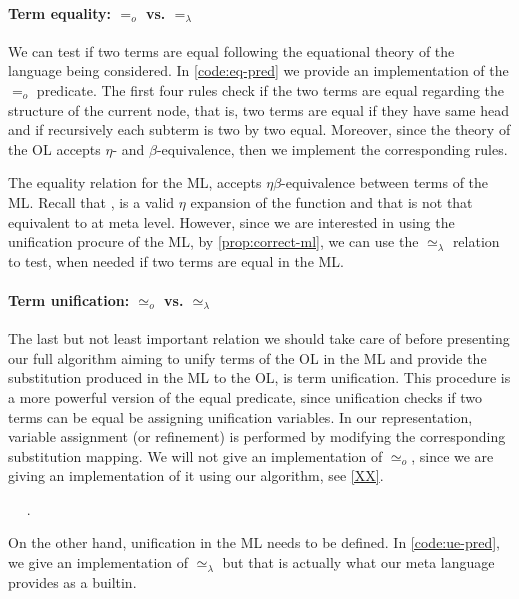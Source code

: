 \documentclass[sigconf,natbib=false]{acmart}
\newcommand{\EqualRel}{\ensuremath{=}}
\newcommand{\UnifRel}{\ensuremath{\simeq}}
\newcommand{\Uo}{\ensuremath{\UnifRel_o}\xspace}
\newcommand{\Eo}{\ensuremath{\EqualRel_o}\xspace}
\newcommand{\Ue}{\ensuremath{\UnifRel_\lambda}\xspace}
\newcommand{\Ee}{\ensuremath{\EqualRel_\lambda}\xspace}
\begin{document}
\paragraph{Term equality: \Eo vs. \Ee} We can test if two terms are equal
following the equational theory of the language being considered. In
\cref{code:eq-pred} we provide an implementation of the \Eo predicate. The first
four rules check if the two terms are equal regarding the structure of the
current node, that is, two terms are equal if they have same head and if
recursively each subterm is two by two equal. Moreover, since the theory of the
OL accepts $\eta$- and $\beta$-equivalence, then we implement the corresponding
rules.

\noindent
The equality relation for the ML, accepts $\eta\beta$-equivalence between terms
of the ML. Recall that , is a valid $\eta$ expansion of the
function  and that  is not that equivalent to
 at meta level. However, since we are interested in using the
unification procure of the ML, by \cref{prop:correct-ml}, we can use the
\Ue relation to test, when needed if two terms are equal in the ML.

\paragraph{Term unification: \Uo vs. \Ue} 
The last but not least important relation we should take care of before
presenting our full algorithm aiming to unify terms of the OL in the ML and
provide the substitution produced in the ML to the OL, is term unification. This
procedure is a more powerful version of the equal predicate, since unification
checks if two terms can be equal be assigning unification variables. In our
representation, variable assignment (or refinement) is performed by modifying
the corresponding substitution mapping. We will not give an implementation of
\Uo, since we are giving an implementation of it using
our algorithm, see \cref{XX}.

\begin{elpicode}
~ \PYG{n+nf}{(\Ue)} ~.
\end{elpicode}

On the other hand, unification in the ML needs to be defined. In
\cref{code:ue-pred}, we give an implementation of \Ue but
that is actually what our meta language provides as a builtin.
\end{document}
